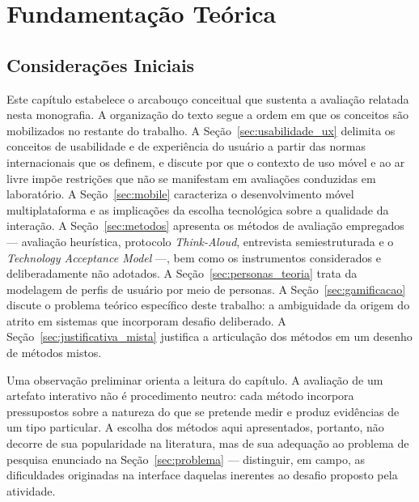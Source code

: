 \chapter{Fundamentação Teórica}
\label{cap:fundamentacao}

\section{Considerações Iniciais}
\label{sec:fund_consideracoes}

Este capítulo estabelece o arcabouço conceitual que sustenta a avaliação relatada
nesta monografia. A organização do texto segue a ordem em que os conceitos são
mobilizados no restante do trabalho. A Seção~\ref{sec:usabilidade_ux} delimita os
conceitos de usabilidade e de experiência do usuário a partir das normas
internacionais que os definem, e discute por que o contexto de uso móvel e ao ar
livre impõe restrições que não se manifestam em avaliações conduzidas em
laboratório. A Seção~\ref{sec:mobile} caracteriza o desenvolvimento móvel
multiplataforma e as implicações da escolha tecnológica sobre a qualidade da
interação. A Seção~\ref{sec:metodos} apresenta os métodos de avaliação
empregados --- avaliação heurística, protocolo \textit{Think-Aloud}, entrevista
semiestruturada e o \textit{Technology Acceptance Model} ---, bem como os
instrumentos considerados e deliberadamente não adotados. A
Seção~\ref{sec:personas_teoria} trata da modelagem de perfis de usuário por meio
de personas. A Seção~\ref{sec:gamificacao} discute o problema teórico específico
deste trabalho: a ambiguidade da origem do atrito em sistemas que incorporam
desafio deliberado. A Seção~\ref{sec:justificativa_mista} justifica a articulação
dos métodos em um desenho de métodos mistos.

Uma observação preliminar orienta a leitura do capítulo. A avaliação de um
artefato interativo não é procedimento neutro: cada método incorpora pressupostos
sobre a natureza do que se pretende medir e produz evidências de um tipo
particular. A escolha dos métodos aqui apresentados, portanto, não decorre de sua
popularidade na literatura, mas de sua adequação ao problema de pesquisa
enunciado na Seção~\ref{sec:problema} --- distinguir, em campo, as dificuldades
originadas na interface daquelas inerentes ao desafio proposto pela atividade.

